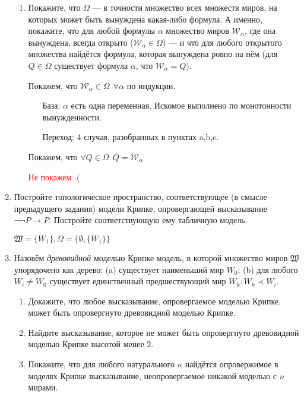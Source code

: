 \begin{enumerate}[wide, labelwidth=!, labelindent=0pt]
\begin{enumerate}
              \item Покажите, что $\Omega$ --- в точности множество всех множеств миров, на которых может быть вынуждена какая-либо формула.
                    А именно, покажите, что для любой формулы $\alpha$ множество миров $\mathcal{W}_\alpha$, где она вынуждена, всегда открыто
                    ($\mathcal{W}_\alpha \in \Omega$) --- и что для любого открытого множества найдётся формула, которая вынуждена ровно на нём
                    (для $Q \in \Omega$ существует формула $\alpha$, что $\mathcal{W}_\alpha = Q$).

                    Покажем, что \(\mathcal{W}_\alpha \in \Omega \ \ \forall \alpha\) по индукции.

                    \begin{itemize}
                        \item [База:] \(\alpha\) есть одна переменная. Искомое выполнено по монотонности вынужденности.
                        \item [Переход:] 4 случая, разобранных в пунктах a,b,c.
                    \end{itemize}

                    Покажем, что \(\forall Q\in \Omega \ \ Q = \mathcal{W}_\alpha\)

                    \textcolor{red}{Не покажем :(}
          \end{enumerate}

    \item Постройте топологическое пространство, соответствующее (в смысле предыдущего задания) модели Крипке, опровергающей
          высказывание $\neg\neg P\rightarrow P$.
          Постройте соответствующую ему табличную модель.

          \(\mathfrak{W} = \{W_1\}, \Omega = \{\emptyset, \{W_1\}\} \)

    \item Назовём \emph{древовидной} моделью Крипке модель, в которой множество
          миров $\mathfrak{W}$ упорядочено как дерево: (a) существует наименьший мир
          $W_0$; (b) для любого $W_i \ne W_0$ существует единственный предшествующий мир
          $W_k: W_k \prec W_i$.
          \begin{enumerate}
              \item Докажите, что любое высказывание, опровергаемое моделью Крипке, может
                    быть опровергнуто древовидной моделью Крипке.

              \item Найдите высказывание, которое не может быть опровергнуто древовидной моделью Крипке
                    высотой менее 2.
              \item Покажите, что для любого натурального $n$ найдётся опровержимое в моделях Крипке высказывание,
                    неопровергаемое никакой моделью с $n$ мирами.
          \end{enumerate}


\end{enumerate}
